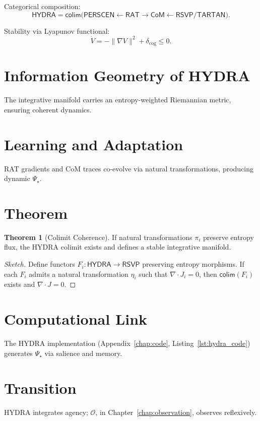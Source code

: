 \documentclass[12pt]{book}
\theoremstyle{definition}
\newtheorem{theorem}{Theorem}[chapter]
\begin{document}
Categorical composition:
\begin{equation}
\textsf{HYDRA} = \textsf{colim}\Big( \textsf{PERSCEN} \xleftarrow{} \textsf{RAT} \xrightarrow{} \textsf{CoM} \xleftarrow{} \textsf{RSVP/TARTAN} \Big).
\end{equation}

Stability via Lyapunov functional:
\begin{equation}
\dot{V} = -\|\nabla V\|^2 + \delta_{\text{cog}} \leq 0.
\end{equation}

\section{Information Geometry of HYDRA}
The integrative manifold carries an entropy-weighted Riemannian metric, ensuring coherent dynamics.

\section{Learning and Adaptation}
RAT gradients and CoM traces co-evolve via natural transformations, producing dynamic $\Psi_\star$.

\section{Theorem}
\begin{theorem}[Colimit Coherence]
\label{thm:colimit_coherence}
If natural transformations $\pi_i$ preserve entropy flux, the HYDRA colimit exists and defines a stable integrative manifold.
\end{theorem}

\begin{proof}[Sketch]
Define functors $F_i: \textsf{HYDRA} \to \textsf{RSVP}$ preserving entropy morphisms. If each $F_i$ admits a natural transformation $\eta_i$ such that $\nabla \cdot J_i = 0$, then $\textsf{colim}(F_i)$ exists and $\nabla \cdot J = 0$.
\end{proof}

\section{Computational Link}
The HYDRA implementation (Appendix~\ref{chap:code}, Listing~\ref{lst:hydra_code}) generates $\Psi_\star$ via salience and memory.

\section{Transition}
HYDRA integrates agency; $\mathcal{O}$, in Chapter~\ref{chap:observation}, observes reflexively.
\end{document}
